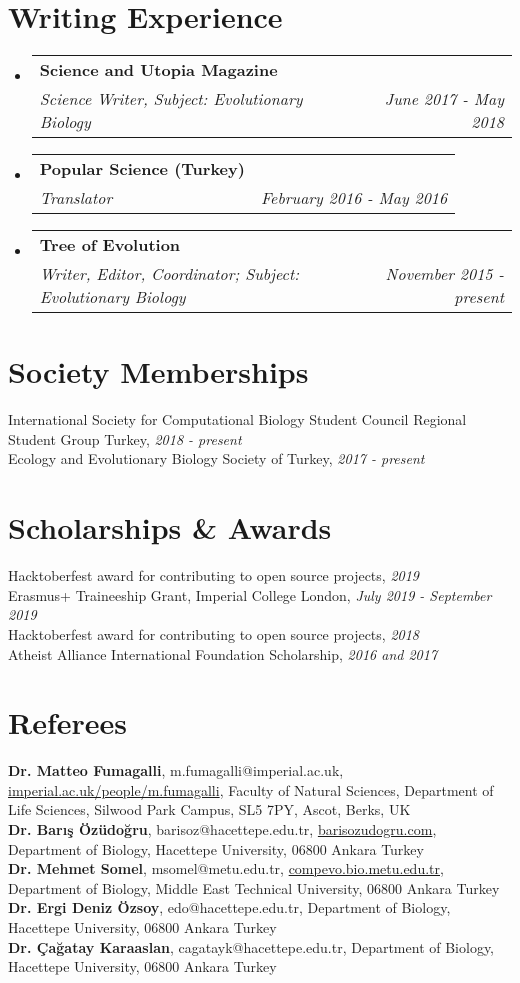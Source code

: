 \documentclass[letterpaper,11pt]{article}
\makeatletter
\newcommand{\resumeSubheading}[4]{
  \vspace{-1pt}\item
    \begin{tabular*}{0.97\textwidth}{l@{\extracolsep{\fill}}r}
      \textbf{#1} & #2 \\
      \textit{\small#3} & \textit{\small #4} \\
    \end{tabular*}\vspace{-5pt}
}
\newcommand{\resumeSubHeadingListStart}{\begin{itemize}[leftmargin=*]}
\newcommand{\resumeSubHeadingListEnd}{\end{itemize}}
\makeatother
\begin{document}
\section{Writing Experience}
  \resumeSubHeadingListStart
    \resumeSubheading
      {Science and Utopia Magazine}{ }
      {Science Writer, Subject: Evolutionary Biology}{June 2017 - May 2018}
    \resumeSubheading
      {Popular Science (Turkey)}{ }
      {Translator}{February 2016 - May 2016}
    \resumeSubheading
      {Tree of Evolution}{ }
      {Writer, Editor, Coordinator; Subject: Evolutionary Biology}{November 2015 - present}
  \resumeSubHeadingListEnd

\section{Society Memberships}	
International Society for Computational Biology Student Council Regional Student Group Turkey, \textit{2018 - present} \\
Ecology and Evolutionary Biology Society of Turkey, \textit{2017 - present} \\


\section{Scholarships \& Awards}
Hacktoberfest award for contributing to open source projects, \textit{2019} \\
Erasmus+ Traineeship Grant, Imperial College London, \textit{July 2019 - September 2019} \\
Hacktoberfest award for contributing to open source projects, \textit{2018} \\
Atheist Alliance International Foundation Scholarship, \textit{2016 and 2017} \\


\section{Referees}
\textbf{Dr. Matteo Fumagalli}, m.fumagalli@imperial.ac.uk, \href{https://www.imperial.ac.uk/people/m.fumagalli}{imperial.ac.uk/people/m.fumagalli}, Faculty of Natural Sciences, Department of Life Sciences, Silwood Park Campus, SL5 7PY, Ascot, Berks, UK \\
\textbf{Dr. Bar{\i}\c{s} \"{O}z\"{u}do\u{g}ru}, barisoz@hacettepe.edu.tr, \href{https://www.barisozudogru.com/}{barisozudogru.com}, Department of Biology, Hacettepe University, 06800 Ankara Turkey \\
\textbf{Dr. Mehmet Somel}, msomel@metu.edu.tr, \href{http://compevo.bio.metu.edu.tr}{compevo.bio.metu.edu.tr}, Department of Biology, Middle East Technical University, 06800 Ankara Turkey \\
\textbf{Dr. Ergi Deniz \"{O}zsoy}, edo@hacettepe.edu.tr, Department of Biology, Hacettepe University, 06800 Ankara Turkey  \\
\textbf{Dr. \c{C}a\u{g}atay Karaaslan}, cagatayk@hacettepe.edu.tr, Department of Biology, Hacettepe University, 06800 Ankara Turkey

\end{document}

